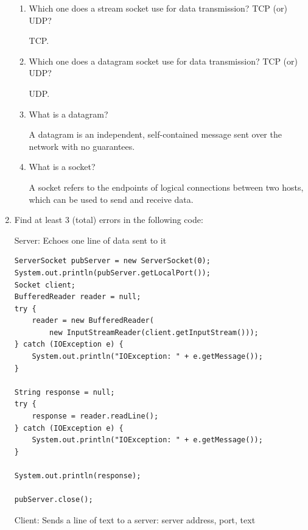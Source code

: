 \documentclass[11pt]{article}
\newenvironment{answer}{\large\lstset{basicstyle=\tiny\ttfamily}\color{white}}{}
\newenvironment{answer}{\large\lstset{basicstyle=\large\ttfamily}\color{red}}{}
\begin{document}
\begin{enumerate}
\begin{enumerate}
		\item Which one does a stream socket use for data transmission? TCP (or) UDP?
		
		\begin{answer}
		TCP. 
		\end{answer}
		
		\item Which one does a datagram socket use for data transmission? TCP (or) UDP?
		
		\begin{answer}
		UDP.
		\end{answer}
		
		\item What is a datagram?
		
		\begin{answer}
		A datagram is an independent, self-contained message sent over the network with no guarantees. %
		\end{answer}
		
		\item What is a socket?
		
		\begin{answer}
		A socket refers to the endpoints of logical connections between two hosts, which can be used to send and receive data.
		\end{answer}
	
	\end{enumerate}


\newpage
\item
	Find at least 3 (total) errors in the following code:

	Server: Echoes one line of data sent to it

	\begin{lstlisting}
ServerSocket pubServer = new ServerSocket(0);
System.out.println(pubServer.getLocalPort());
Socket client;
BufferedReader reader = null;
try {
	reader = new BufferedReader(
		new InputStreamReader(client.getInputStream()));
} catch (IOException e) {
	System.out.println("IOException: " + e.getMessage());
}

String response = null;
try {
	response = reader.readLine();
} catch (IOException e) {
	System.out.println("IOException: " + e.getMessage());
}

System.out.println(response);

pubServer.close();
	\end{lstlisting}

	Client: Sends a line of text to a server: server address, port, text


\end{enumerate}
\end{document}
